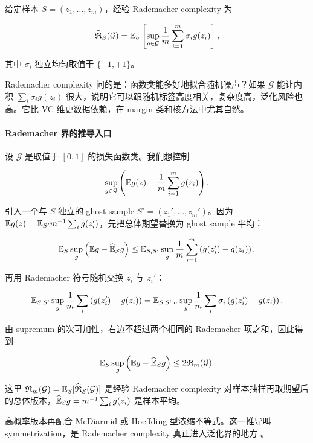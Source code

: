\documentclass[11pt]{ctexart}
\begin{document}
\begin{definition}
给定样本 \(S=(z_1,\ldots,z_m)\)，经验 Rademacher complexity 为

\[
  \widehat{\mathfrak{R}}_S(\mathcal{G})
  =
  \mathbb{E}_{\sigma}
  \left[
    \sup_{g\in\mathcal{G}}
    \frac1m
    \sum_{i=1}^{m}\sigma_i g(z_i)
  \right],
\]

其中 \(\sigma_i\) 独立均匀取值于 \(\{-1,+1\}\)。
\end{definition}

Rademacher complexity 问的是：函数类能多好地拟合随机噪声？如果 \(\mathcal{G}\) 能让内积 \(\sum_i\sigma_i g(z_i)\) 很大，说明它可以跟随机标签高度相关，复杂度高，泛化风险也高。它比 VC 维更数据依赖，在 margin 类和核方法中尤其自然。

\paragraph{Rademacher 界的推导入口}

设 \(\mathcal{G}\) 是取值于 \([0,1]\) 的损失函数类。我们想控制

\[
  \sup_{g\in\mathcal{G}}
  \left(
    \mathbb{E} g(z)-\frac1m\sum_{i=1}^{m}g(z_i)
  \right).
\]

引入一个与 \(S\) 独立的 ghost sample \(S'=(z_1',\ldots,z_m')\)。因为 \(\mathbb{E} g(z)=\mathbb{E}_{S'}m^{-1}\sum_i g(z_i')\)，先把总体期望替换为 ghost sample 平均：

\[
  \mathbb{E}_S
  \sup_g
  \left(
    \mathbb{E} g-\widehat{\mathbb{E}}_S g
  \right)
  \le
  \mathbb{E}_{S,S'}
  \sup_g
  \frac1m
  \sum_{i=1}^{m}
  \left(g(z_i')-g(z_i)\right).
\]

再用 Rademacher 符号随机交换 \(z_i\) 与 \(z_i'\)：

\[
  \mathbb{E}_{S,S'}
  \sup_g
  \frac1m
  \sum_i
  \left(g(z_i')-g(z_i)\right)
  =
  \mathbb{E}_{S,S',\sigma}
  \sup_g
  \frac1m
  \sum_i
  \sigma_i
  \left(g(z_i')-g(z_i)\right).
\]

由 supremum 的次可加性，右边不超过两个相同的 Rademacher 项之和，因此得到

\[
  \mathbb{E}_S
  \sup_g
  \left(
    \mathbb{E} g-\widehat{\mathbb{E}}_S g
  \right)
  \le
  2\mathfrak{R}_m(\mathcal{G}).
\]

这里 \(\mathfrak{R}_m(\mathcal{G})=\mathbb{E}_S[\widehat{\mathfrak{R}}_S(\mathcal{G})]\) 是经验 Rademacher complexity 对样本抽样再取期望后的总体版本，\(\widehat{\mathbb{E}}_S g=m^{-1}\sum_i g(z_i)\) 是样本平均。

高概率版本再配合 McDiarmid 或 Hoeffding 型浓缩不等式。这一推导叫 symmetrization，是 Rademacher complexity 真正进入泛化界的地方 \parencite{mohri2018foundations}。
\end{document}
